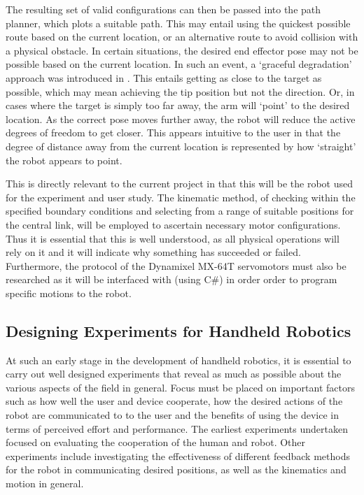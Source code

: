 \documentclass[11pt]{article}
\begin{document}
The resulting set of valid configurations can then be passed into the path planner, which plots a suitable path. This may entail using the quickest possible route based on the current location, or an alternative route to avoid collision with a physical obstacle. In certain situations, the desired end effector pose may not be possible based on the current location. In such an event, a `graceful degradation' approach was introduced in \cite{GreggSmithKinematics}. This entails getting as close to the target as possible, which may mean achieving the tip position but not the direction. Or, in cases where the target is simply too far away, the arm will `point' to the desired location. As the correct pose moves further away, the robot will reduce the active degrees of freedom to get closer. This appears intuitive to the user in that the degree of distance away from the current location is represented by how `straight' the robot appears to point.

This is directly relevant to the current project in that this will be the robot used for the experiment and user study. The kinematic method, of checking within the specified boundary conditions and selecting from a range of suitable positions for the central link, will be employed to ascertain necessary motor configurations. Thus it is essential that this is well understood, as all physical operations will rely on it and it will indicate why something has succeeded or failed. Furthermore, the protocol of the Dynamixel MX-64T servomotors \cite{DYNAMIXEL} must also be researched as it will be interfaced with (using C\#) in order order to program specific motions to the robot.

\subsection{Designing Experiments for Handheld Robotics} \label{designingexperiments}
At such an early stage in the development of handheld robotics, it is essential to carry out well designed experiments that reveal as much as possible about the various aspects of the field in general. Focus must be placed on important factors such as how well the user and device cooperate, how the desired actions of the robot are communicated to to the user and the benefits of using the device in terms of perceived effort and performance. The earliest experiments undertaken focused on evaluating the cooperation of the human and robot. Other experiments include investigating the effectiveness of different feedback methods for the robot in communicating desired positions, as well as the kinematics and motion in general.
\end{document}
